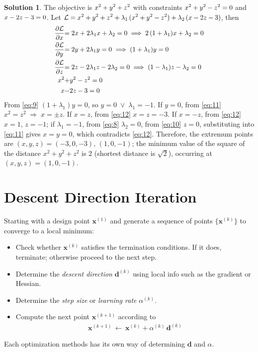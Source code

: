 \documentclass[10pt]{extarticle}
\newcommand{\ds}{\displaystyle}
\newcommand{\ie}{\;\Longrightarrow\;}
\newcommand{\orr}{\;\vee\;}
\theoremstyle{definition}
\newtheorem*{sol}{Solution}
\newcommand{\vd}{\mathbf{d}}
\newcommand{\vx}{\mathbf{x}}
\newcommand{\pdiff}[2]{\frac{\partial #1}{\partial #2}}
\newcommand\scalemath[2]{\scalebox{#1}{\mbox{\ensuremath{\displaystyle #2}}}}
\begin{document}
\begin{sol}
  The objective is $\scalemath{0.95}{x^2 + y^2 + z^2}$ with constraints $\scalemath{0.95}{x^2 + y^2 - z^2 = 0}$ and $\scalemath{0.95}{x - 2z - 3 = 0}$. Let $\ds\scalemath{0.95}{\mathcal{L} = x^2 + y^2 + z^2 + \lambda_1\,(x^2 + y^2 - z^2) + \lambda_2\,(x - 2z - 3)}$, then
  \begin{align}
    \scalemath{0.95}{\pdiff{\mathcal{L}}{x}} &\scalemath{0.95}{= 2 x + 2\lambda_1 x + \lambda_2 = 0 \ie 2\,(1 + \lambda_1) x + \lambda_2 = 0}\label{eq:8}\\
    \scalemath{0.95}{\pdiff{\mathcal{L}}{y}} &\scalemath{0.95}{= 2 y + 2\lambda_1 y = 0 \ie (1 + \lambda_1)y = 0}\label{eq:9} \\
    \scalemath{0.95}{\pdiff{\mathcal{L}}{z}} &\scalemath{0.95}{= 2 z - 2\lambda_1 z - 2\lambda_2 = 0 \ie (1 - \lambda_1)z - \lambda_2 = 0}\label{eq:10}\\
    \scalemath{0.95}{x^2} &\scalemath{0.95}{+ y^2 - z^2 = 0}\label{eq:11} \\
    \scalemath{0.95}{x} &\scalemath{0.95}{- 2z - 3 = 0}\label{eq:12}
  \end{align}
  From \eqref{eq:9} $(1 + \lambda_1) y = 0$, so $y = 0\orr\lambda_1 = -1$. If $y = 0$, from \eqref{eq:11} $x^2 = z^2 \ie x = \pm z$. If $x = z$, from \eqref{eq:12} $x = z = -3$. If $x = -z$, from \eqref{eq:12} $x = 1$, $z = -1$; if $\lambda_1 = -1$, from \eqref{eq:8} $\lambda_2 = 0$, from \eqref{eq:10} $z = 0$, substituting into \eqref{eq:11} gives $x = y = 0$, which contradicts \eqref{eq:12}. Therefore, the extremum points are $(x, y, z) = (-3, 0, -3),\,(1, 0, -1)$; the minimum value of the square of the distance $x^2 + y^2 + z^2$ is $2$ (shortest distance is $\sqrt{2}$), occurring at $(x, y, z) = (1, 0, -1)$. 
\end{sol}


\newpage

\section*{Descent Direction Iteration}

Starting with a design point $\vx^{(1)}$ and generate a sequence of points $\{\vx^{(k)}\}$ to converge to a local minimum:
\begin{itemize}
  \item Check whether $\vx^{(k)}$ satisfies the termination conditions. If it does, terminate; otherwise proceed to the next step.
  \item Determine the \emph{descent direction} $\vd^{(k)}$ using local info such as the gradient or Hessian.
  \item Determine the \emph{step size} or \emph{learning rate} $\alpha^{(k)}$.
  \item Compute the next point $\vx^{(k + 1)}$ according to 
    \begin{align*}
      \vx^{(k + 1)}\,\longleftarrow\, \vx^{(k)} + \alpha^{(k)}\,\vd^{(k)} 
    \end{align*}
\end{itemize}
Each optimization methods has its own way of determining $\vd$ and $\alpha$.
\end{document}

